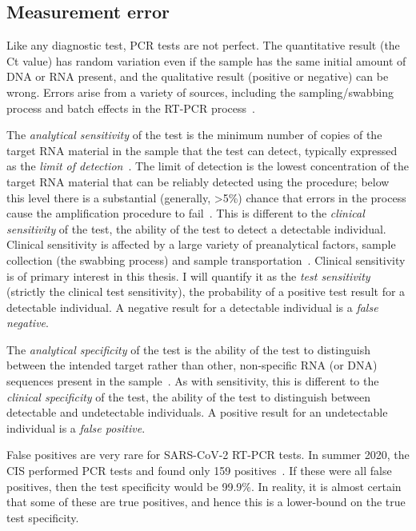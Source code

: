 \documentclass[thesis.tex]{subfiles}
\begin{document}
\subsection{Measurement error} \label{biology-data:sec:measurement-error}

Like any diagnostic test, PCR tests are not perfect.
The quantitative result (the Ct value) has random variation even if the sample has the same initial amount of DNA or RNA present, and the qualitative result (positive or negative) can be wrong.
Errors arise from a variety of sources, including the sampling/swabbing process and batch effects in the RT-PCR process~\autocite{hanRTPCR}.

The \emph{analytical sensitivity} of the test is the minimum number of copies of the target RNA material in the sample that the test can detect, typically expressed as the \emph{limit of detection}~\autocite{bustinMIQE}.
The limit of detection is the lowest concentration of the target RNA material that can be reliably detected using the procedure; below this level there is a substantial (generally, >5\%) chance that errors in the process cause the amplification procedure to fail~\autocite{forootanLOD}.
This is different to the \emph{clinical sensitivity} of the test, the ability of the test to detect a detectable individual.
Clinical sensitivity is affected by a large variety of preanalytical factors, \eg sample collection (\ie the swabbing process) and sample transportation~\autocite{lippiPotential}.
Clinical sensitivity is of primary interest in this thesis.
I will quantify it as the \emph{test sensitivity} (strictly the clinical test sensitivity), the probability of a positive test result for a detectable individual.
A negative result for a detectable individual is a \emph{false negative}.

The \emph{analytical specificity} of the test is the ability of the test to distinguish between the intended target rather than other, non-specific RNA (or DNA) sequences present in the sample~\autocite{bustinMIQE}.
As with sensitivity, this is different to the \emph{clinical specificity} of the test, the ability of the test to distinguish between detectable and undetectable individuals.
A positive result for an undetectable individual is a \emph{false positive}.

False positives are very rare for SARS-CoV-2 RT-PCR tests.
In summer 2020, the CIS performed PCR tests and found only 159 positives~\autocite[section 5]{cisMethodsONS}.
If these were all false positives, then the test specificity would be 99.9\%.
In reality, it is almost certain that some of these are true positives, and hence this is a lower-bound on the true test specificity.
\end{document}
